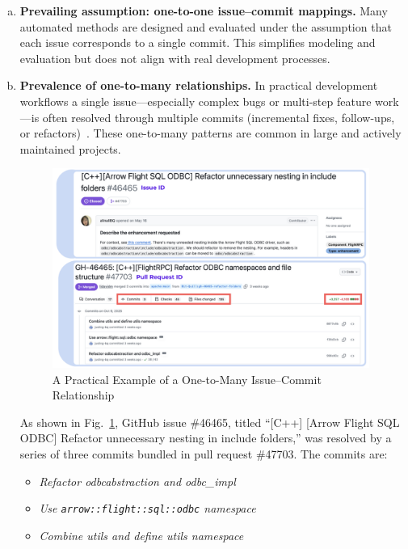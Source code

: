 \begin{enumerate}[a)]
	\item \textbf{Prevailing assumption: one-to-one issue--commit mappings.} Many automated methods are designed and evaluated under the assumption that each issue corresponds to a single commit. This simplifies modeling and evaluation but does not align with real development processes.
	

	\item \textbf{Prevalence of one-to-many relationships.} In practical development workflows a single issue—especially complex bugs or multi-step feature work—is often resolved through multiple commits (incremental fixes, follow-ups, or refactors)~\cite{r7,r17}. These one-to-many patterns are common in large and actively maintained projects.
	
    \begin{figure}[H]
        \centering
        \includegraphics[width=0.98\textwidth]{Figures/issue-pr-demo-example.png}
        \caption{A Practical Example of a One-to-Many Issue--Commit Relationship}
        \label{fig:issue_pr_demo_example}
    \end{figure}

    As shown in Fig.~\ref{fig:issue_pr_demo_example}, GitHub issue \#46465, titled ``[C++] [Arrow Flight SQL ODBC] Refactor unnecessary nesting in include folders,'' was resolved by a series of three commits bundled in pull request \#47703. The commits are:

    \begin{itemize}
        \item \textit{Refactor odbcabstraction and odbc\_impl}
        \item \textit{Use \texttt{arrow::flight::sql::odbc} namespace}
        \item \textit{Combine utils and define utils namespace}
    \end{itemize}


\end{enumerate}
